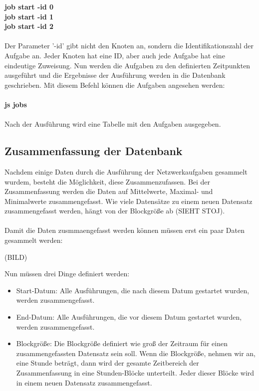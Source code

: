 \documentclass[12pt,a4paper]{report}
\begin{document}
\textbf{job start -id 0}\\
\textbf{job start -id 1}\\
\textbf{job start -id 2}\\\\
Der Parameter '-id' gibt nicht den Knoten an, sondern die Identifikationszahl der Aufgabe an. Jeder Knoten hat eine ID, aber auch jede Aufgabe hat eine eindeutige Zuweisung. Nun werden die Aufgaben zu den definierten Zeitpunkten ausgeführt und die Ergebnisse der Ausführung werden in die Datenbank geschrieben. Mit diesem Befehl können die Aufgaben angesehen werden: \\\\
\textbf{js jobs}\\\\
Nach der Ausführung wird eine Tabelle mit den Aufgaben ausgegeben.

\subsection{Zusammenfassung der Datenbank}

Nachdem einige Daten durch die Ausführung der Netzwerkaufgaben gesammelt wurdem, besteht die Möglichkeit, diese Zusammenzufassen. Bei der Zusammenfassung werden die Daten auf Mittelwerte, Maximal- und Minimalwerte zusammengefasst. Wie viele Datensätze zu einem neuen Datensatz zusammengefasst werden, hängt von der Blockgröße ab (SIEHT STOJ).\\\\
Damit die Daten zusmmaengefasst werden können müssen erst ein paar Daten gesammelt werden:

(BILD)

Nun müssen drei Dinge definiert werden:

\begin{itemize}
\item Start-Datum: Alle Ausführungen, die nach diesem Datum gestartet wurden, werden zusammengefasst.
\item End-Datum: Alle Ausführungen, die vor diesem Datum gestartet wurden, werden zusammengefasst.
\item Blockgröße: Die Blockgröße definiert wie groß der Zeitraum für einen zusammengefassten Datensatz sein soll. Wenn die Blockgröße, nehmen wir an, eine Stunde beträgt, dann wird der gesamte Zeitbereich der Zusammenfassung in eine Stunden-Blöcke unterteilt. Jeder dieser Blöcke wird in einem neuen Datensatz zusammengefasst.
\end{itemize}
\end{document}
